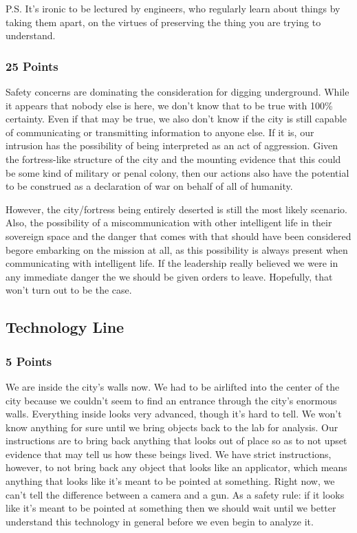 \documentclass[conference]{IEEEtran}
\begin{document}
P.S. It’s ironic to be lectured by engineers, who regularly learn about things by taking them apart, on the virtues of preserving the thing you are trying to understand.

\subsubsection*{25 Points}
Safety concerns are dominating the consideration for digging underground. While it appears that nobody else is here, we don’t know that to be true with 100\% certainty. Even if that may be true, we also don’t know if the city is still capable of communicating or transmitting information to anyone else. If it is, our intrusion has the possibility of being interpreted as an act of aggression. Given the fortress-like structure of the city and the mounting evidence that this could be some kind of military or penal colony, then our actions also have the potential to be construed as a declaration of war on behalf of all of humanity. 

However, the city/fortress being entirely deserted is still the most likely scenario. Also, the possibility of a miscommunication with other intelligent life in their sovereign space and the danger that comes with that should have been considered begore embarking on the mission at all, as this possibility is always present when communicating with intelligent life. If the leadership really believed we were in any immediate danger the we should be given orders to leave. Hopefully, that won’t turn out to be the case.  

\subsection{Technology Line}

\subsubsection*{5 Points}

We are inside the city’s walls now. We had to be airlifted into the center of the city because we couldn’t seem to find an entrance through the city’s enormous walls. Everything inside looks very advanced, though it’s hard to tell. We won’t know anything for sure until we bring objects back to the lab for analysis. Our instructions are to bring back anything that looks out of place so as to not upset evidence that may tell us how these beings lived. We have strict instructions, however, to not bring back any object that looks like an applicator, which means anything that looks like it’s meant to be pointed at something. Right now, we can’t tell the difference between a camera and a gun. As a safety rule: if it looks like it’s meant to be pointed at something then we should wait until we better understand this technology in general before we even begin to analyze it. 
\end{document}
